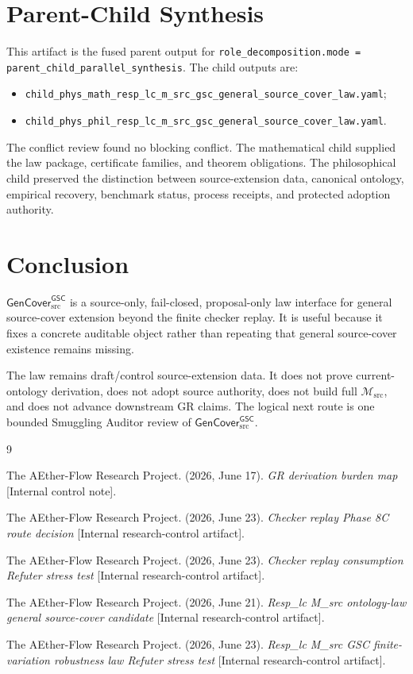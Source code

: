 \documentclass[11pt]{article}
\newcommand{\Msrc}{\mathcal{M}_{\mathrm{src}}}
\newcommand{\GenCover}{\mathsf{GenCover}_{\mathrm{src}}^{\mathsf{GSC}}}
\begin{document}
\section{Parent-Child Synthesis}

This artifact is the fused parent output for
\texttt{role\_decomposition.mode = parent\_child\_parallel\_synthesis}. The
child outputs are:
\begin{itemize}
  \item \texttt{child\_phys\_math\_resp\_lc\_m\_src\_gsc\_general\_source\_cover\_law.yaml};
  \item \texttt{child\_phys\_phil\_resp\_lc\_m\_src\_gsc\_general\_source\_cover\_law.yaml}.
\end{itemize}
The conflict review found no blocking conflict. The mathematical child
supplied the law package, certificate families, and theorem obligations. The
philosophical child preserved the distinction between source-extension data,
canonical ontology, empirical recovery, benchmark status, process receipts,
and protected adoption authority.

\section{Conclusion}

\(\GenCover\) is a source-only, fail-closed, proposal-only law interface for
general source-cover extension beyond the finite checker replay. It is useful
because it fixes a concrete auditable object rather than repeating that
general source-cover existence remains missing.

The law remains draft/control source-extension data. It does not prove
current-ontology derivation, does not adopt source authority, does not build
full \(\Msrc\), and does not advance downstream GR claims. The logical next
route is one bounded Smuggling Auditor review of \(\GenCover\).

\begin{thebibliography}{9}

The AEther-Flow Research Project. (2026, June 17). \emph{GR derivation burden
map} [Internal control note].

The AEther-Flow Research Project. (2026, June 23). \emph{Checker replay Phase
8C route decision} [Internal research-control artifact].

The AEther-Flow Research Project. (2026, June 23). \emph{Checker replay
consumption Refuter stress test} [Internal research-control artifact].

The AEther-Flow Research Project. (2026, June 21). \emph{Resp\_lc M\_src
ontology-law general source-cover candidate} [Internal research-control
artifact].

The AEther-Flow Research Project. (2026, June 23). \emph{Resp\_lc M\_src GSC
finite-variation robustness law Refuter stress test} [Internal
research-control artifact].

\end{thebibliography}
\end{document}
